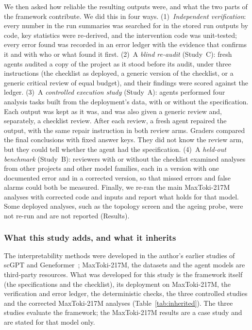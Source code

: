 We then asked how reliable the resulting outputs were, and what the two
parts of the framework contribute. We did this in four ways.
(1)~\emph{Independent verification}: every number in the run summaries was searched for in
the stored run outputs by code, key statistics were re-derived, and the
intervention code was unit-tested; every error found was recorded in an
error ledger with the evidence that confirms it and with who or what found
it first. (2)~A \emph{blind re-audit} (Study~C): fresh agents audited a
copy of the project as it stood before its audit, under three
instructions (the checklist as deployed, a generic version of the
checklist, or a generic critical review of equal budget), and their
findings were scored against the ledger. (3)~A \emph{controlled
execution study} (Study~A): agents performed four analysis tasks built
from the deployment's data, with or without the specification. Each
output was kept as it was, and was also given a generic review and,
separately, a checklist review. After each review, a fresh agent repaired
the output, with the same repair instruction in both review arms. Graders
compared the final conclusions with fixed answer keys. They did not know
the review arm, but they could tell whether the agent had the
specification. (4)~A \emph{held-out benchmark} (Study~B): reviewers with or
without the checklist examined analyses from other projects and other
model families, each in a version with one documented error and in a
corrected version, so that missed errors and false alarms could both be
measured. Finally, we re-ran the main MaxToki-217M analyses with corrected code
and inputs and report what holds for that model. Some deployed analyses,
such as the topology screen and the ageing probe, were not re-run and are
not reported (Results).

\subsubsection*{What this study adds, and what it inherits}
The interpretability methods were developed in the author's earlier
studies of scGPT and
Geneformer~\cite{anon2026attention,anon2026spectral,anon2026topology,anon2026sae,anon2026circuits,anon2026manifold,anon2026exhaustive,anon2026ageing};
MaxToki-217M, the datasets and the agent models are third-party
resources. What was developed for this study is the framework itself (the
specifications and the checklist), its deployment on MaxToki-217M, the
verification and error ledger, the deterministic checks, the three
controlled studies and the corrected MaxToki-217M analyses
(Table~\ref{tab:inherited}). The three studies evaluate the framework;
the MaxToki-217M results are a case study and are stated for that model
only.

